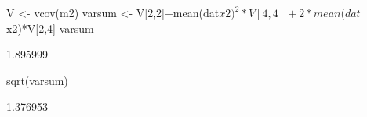 \begin{Schunk}
\begin{Sinput}
 V <- vcov(m2)
 varsum <- V[2,2]+mean(dat$x2)^2*V[4,4]+2*mean(dat$x2)*V[2,4]
 varsum
\end{Sinput}
\begin{Soutput}
[1] 1.895999
\end{Soutput}
\begin{Sinput}
 sqrt(varsum)
\end{Sinput}
\begin{Soutput}
[1] 1.376953
\end{Soutput}
\end{Schunk}
